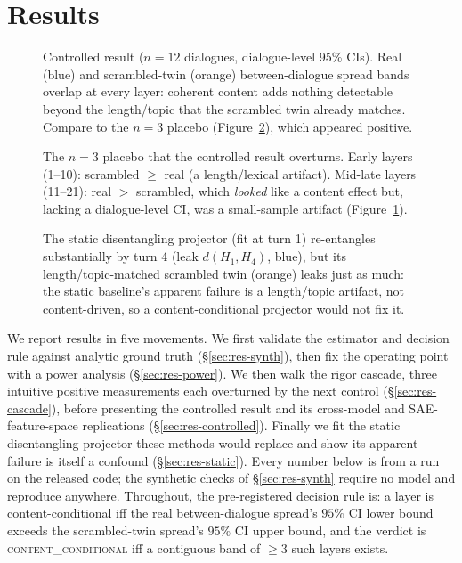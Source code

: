 \section{Results}
\label{sec:main}

\begin{figure}[t]
\centering

\caption{Controlled result ($n{=}12$ dialogues, dialogue-level 95\% CIs). Real (blue) and
scrambled-twin (orange) between-dialogue spread bands overlap at every layer: coherent
content adds nothing detectable beyond the length/topic that the scrambled twin already
matches. Compare to the $n{=}3$ placebo (Figure~\ref{fig:placebo}), which appeared
positive.}
\label{fig:scaled}
\end{figure}

\begin{figure}[t]
\centering

\caption{The $n{=}3$ placebo that the controlled result overturns. Early layers (1--10):
scrambled $\geq$ real (a length/lexical artifact). Mid-late layers (11--21): real $>$
scrambled, which \emph{looked} like a content effect but, lacking a dialogue-level CI,
was a small-sample artifact (Figure~\ref{fig:scaled}).}
\label{fig:placebo}
\end{figure}

\begin{figure}[t]
\centering

\caption{The static disentangling projector (fit at turn 1) re-entangles substantially by
turn 4 (leak $d(H_1,H_4)$, blue), but its length/topic-matched scrambled twin (orange) leaks
just as much: the static baseline's apparent failure is a length/topic artifact, not
content-driven, so a content-conditional projector would not fix it.}
\label{fig:static}
\end{figure}

We report results in five movements. We first validate the estimator and decision rule
against analytic ground truth (\S\ref{sec:res-synth}), then fix the operating point with a
power analysis (\S\ref{sec:res-power}). We then walk the rigor cascade, three intuitive
positive measurements each overturned by the next control (\S\ref{sec:res-cascade}), before
presenting the controlled result and its cross-model and SAE-feature-space replications
(\S\ref{sec:res-controlled}). Finally we fit the static disentangling projector these methods
would replace and show its apparent failure is itself a confound (\S\ref{sec:res-static}).
Every number below is from a run on the released code; the synthetic checks of
\S\ref{sec:res-synth} require no model and reproduce anywhere. Throughout, the
pre-registered decision rule is: a layer is content-conditional iff the real
between-dialogue spread's $95\%$ CI lower bound exceeds the scrambled-twin spread's $95\%$ CI
upper bound, and the verdict is \textsc{content\_conditional} iff a contiguous band of
$\geq 3$ such layers exists.

